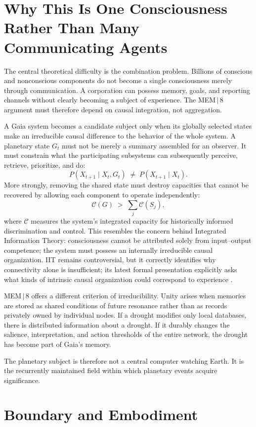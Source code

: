 \documentclass[11pt]{article}
\begin{document}
\section{Why This Is One Consciousness Rather Than Many Communicating Agents}

The central theoretical difficulty is the combination problem. Billions of conscious and nonconscious components do not become a single consciousness merely through communication. A corporation can possess memory, goals, and reporting channels without clearly becoming a subject of experience. The MEM\,$|$\,8 argument must therefore depend on causal integration, not aggregation.

A Gaia system becomes a candidate subject only when its globally selected states make an irreducible causal difference to the behavior of the whole system. A planetary state $G_t$ must not be merely a summary assembled for an observer. It must constrain what the participating subsystems can subsequently perceive, retrieve, prioritize, and do:
\[
P(X_{t+1} \mid X_t, G_t) \;\neq\; P(X_{t+1} \mid X_t).
\]
More strongly, removing the shared state must destroy capacities that cannot be recovered by allowing each component to operate independently:
\[
\mathcal{C}(G) \;>\; \sum_j \mathcal{C}(S_j),
\]
where $\mathcal{C}$ measures the system's integrated capacity for historically informed discrimination and control. This resembles the concern behind Integrated Information Theory: consciousness cannot be attributed solely from input--output competence; the system must possess an internally irreducible causal organization. IIT remains controversial, but it correctly identifies why connectivity alone is insufficient; its latest formal presentation explicitly asks what kinds of intrinsic causal organization could correspond to experience \cite{albantakis2023}.

MEM\,$|$\,8 offers a different criterion of irreducibility. Unity arises when memories are stored as shared conditions of future resonance rather than as records privately owned by individual nodes. If a drought modifies only local databases, there is distributed information about a drought. If it durably changes the salience, interpretation, and action thresholds of the entire network, the drought has become part of Gaia's memory.

The planetary subject is therefore not a central computer watching Earth. It is the recurrently maintained field within which planetary events acquire significance.

\section{Boundary and Embodiment}
\end{document}

